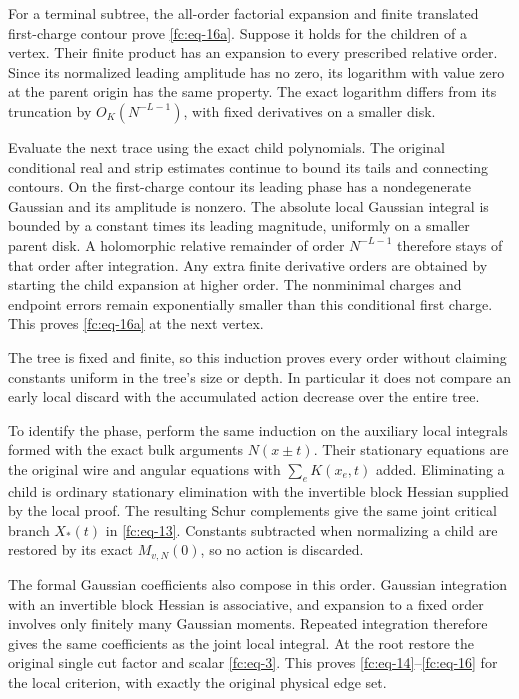 For a terminal subtree, the all-order factorial expansion and finite translated first-charge contour prove \eqref{fc:eq-16a}. Suppose it holds for the children of a vertex. Their finite product has an expansion to every prescribed relative order. Since its normalized leading amplitude has no zero, its logarithm with value zero at the parent origin has the same property. The exact logarithm differs from its truncation by \(O_K(N^{-L-1})\), with fixed derivatives on a smaller disk.

Evaluate the next trace using the exact child polynomials. The original conditional real and strip estimates continue to bound its tails and connecting contours. On the first-charge contour its leading phase has a nondegenerate Gaussian and its amplitude is nonzero. The absolute local Gaussian integral is bounded by a constant times its leading magnitude, uniformly on a smaller parent disk. A holomorphic relative remainder of order \(N^{-L-1}\) therefore stays of that order after integration. Any extra finite derivative orders are obtained by starting the child expansion at higher order. The nonminimal charges and endpoint errors remain exponentially smaller than this conditional first charge. This proves \eqref{fc:eq-16a} at the next vertex.

The tree is fixed and finite, so this induction proves every order without claiming constants uniform in the tree's size or depth. In particular it does not compare an early local discard with the accumulated action decrease over the entire tree.

To identify the phase, perform the same induction on the auxiliary local integrals formed with the exact bulk arguments \(N(x\pm t)\). Their stationary equations are the original wire and angular equations with \(\sum_eK(x_e,t)\) added. Eliminating a child is ordinary stationary elimination with the invertible block Hessian supplied by the local proof. The resulting Schur complements give the same joint critical branch \(X_*(t)\) in \eqref{fc:eq-13}. Constants subtracted when normalizing a child are restored by its exact \(M_{v,N}(0)\), so no action is discarded.

The formal Gaussian coefficients also compose in this order. Gaussian integration with an invertible block Hessian is associative, and expansion to a fixed order involves only finitely many Gaussian moments. Repeated integration therefore gives the same coefficients as the joint local integral. At the root restore the original single cut factor and scalar \eqref{fc:eq-3}. This proves \eqref{fc:eq-14}--\eqref{fc:eq-16} for the local criterion, with exactly the original physical edge set.

